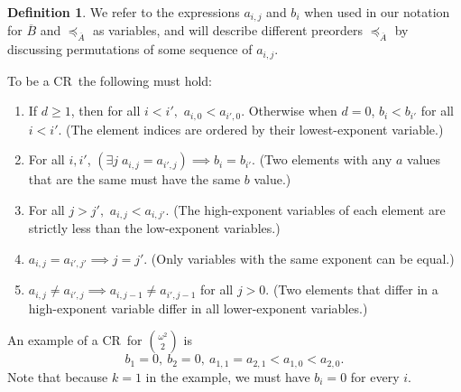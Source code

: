 \documentclass[11pt]{article}
\newcommand{\om}{\omega}
\newcommand{\crulenospace}{CR}
\newcommand{\crule}{\crulenospace~}
\newcommand{\crules}{\crulenospace s~}
\newcommand{\xleq}{\preceq_{\overline{A}}}
\newcommand{\assny}{\overline{B}}
\newcommand{\inumpoints}{i}
\newcommand{\idegr}{j}
\newcommand{\commonconst}{a}
\newcommand{\rareconst}{b}
\theoremstyle{plain}
\theoremstyle{definition}
\newtheorem{definition}[theorem]{Definition}
\begin{document}
\begin{definition}
We refer to the expressions $\commonconst_{\inumpoints,\idegr}$ and $\rareconst_\inumpoints$ when used in our notation for $\assny$ and $\xleq$ as variables, and will describe different preorders $\xleq$ by discussing permutations of some sequence of $\commonconst_{\inumpoints,\idegr}$.

To be a \crule the following must hold:

\begin{enumerate}
    \item \label{cr:index-ordering} If $d \geq 1$, then for all $\inumpoints < \inumpoints',$ $\commonconst_{\inumpoints, 0} < \commonconst_{\inumpoints' ,0}.$ Otherwise when $d = 0$, $\rareconst_{\inumpoints} < \rareconst_{\inumpoints'}$ for all $\inumpoints<\inumpoints'$. (The element indices are ordered by their lowest-exponent variable.) 
    \item \label{cr:y-distinct} For all $\inumpoints,\inumpoints'$, $(\exists \idegr\; \commonconst_{\inumpoints,\idegr} = \commonconst_{\inumpoints',\idegr})\implies \rareconst_{\inumpoints} = \rareconst_{\inumpoints'}$. (Two elements with any $\commonconst$ values that are the same must have the same $\rareconst$ value.)
    \item \label{cr:high-first} For all $\idegr > \idegr',$ $\commonconst_{\inumpoints, \idegr} < \commonconst_{\inumpoints, \idegr'}$. (The high-exponent variables of each element are strictly less than the low-exponent variables.)
    \item \label{cr:term-dim-diff} $\commonconst_{\inumpoints, \idegr} = \commonconst_{\inumpoints', \idegr'} \implies \idegr = \idegr'$. (Only variables with the same exponent can be equal.)
    \item \label{cr:high-split} $\commonconst_{\inumpoints, \idegr} \neq \commonconst_{\inumpoints', \idegr} \implies \commonconst_{\inumpoints,\idegr-1} \neq \commonconst_{\inumpoints',\idegr-1}$ for all $\idegr>0$. (Two elements that differ in a high-exponent variable differ in all lower-exponent variables.)
\end{enumerate}

An example of a \crule for $\binom{\om^2}{2}$ is $$\rareconst_1=0,~\rareconst_2=0,~\commonconst_{1, 1} = \commonconst_{2, 1} < \commonconst_{1, 0} < \commonconst_{2, 0}.$$
Note that because $k=1$ in the example, we must have $\rareconst_{\inumpoints} = 0$ for every $\inumpoints$.


\end{definition}
\end{document}
